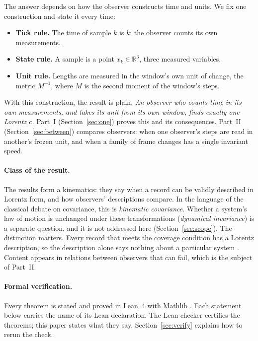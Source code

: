 \documentclass[11pt]{article}
\newcommand{\R}{\mathbb{R}}
\theoremstyle{definition}
\theoremstyle{plain}
\theoremstyle{remark}
\begin{document}
The answer depends on how the observer constructs time and units. We fix one construction and state it every time:
\begin{itemize}
\item \textbf{Tick rule.} The time of sample $k$ is $k$: the observer counts its own measurements.
\item \textbf{State rule.} A sample is a point $x_k \in \R^3$, three measured variables.
\item \textbf{Unit rule.} Lengths are measured in the window's own unit of change, the metric $M^{-1}$, where $M$ is the second moment of the window's steps.
\end{itemize}
With this construction, the result is plain. \emph{An observer who counts time in its own measurements, and takes its unit from its own window, finds exactly one Lorentz $c$.} Part~I (Section~\ref{sec:one}) proves this and its consequences. Part~II (Section~\ref{sec:between}) compares observers: when one observer's steps are read in another's frozen unit, and when a family of frame changes has a single invariant speed.

\paragraph{Class of the result.} The results form a kinematics: they say when a record can be validly described in Lorentz form, and how observers' descriptions compare. In the language of the classical debate on covariance, this is \emph{kinematic covariance}. Whether a system's law of motion is unchanged under these transformations (\emph{dynamical invariance}) is a separate question, and it is not addressed here (Section~\ref{sec:scope}). The distinction matters. Every record that meets the coverage condition has a Lorentz description, so the description alone says nothing about a particular system \cite{norton1993,duff2002}. Content appears in relations between observers that can fail, which is the subject of Part~II.

\paragraph{Formal verification.} Every theorem is stated and proved in Lean~4 \cite{lean4} with Mathlib \cite{mathlib2020}. Each statement below carries the name of its Lean declaration. The Lean checker certifies the theorems; this paper states what they say. Section~\ref{sec:verify} explains how to rerun the check.
\end{document}
